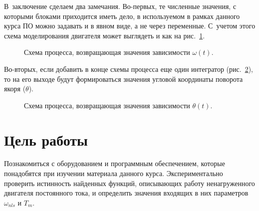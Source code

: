 \documentclass[12pt,a4paper,openany]{extarticle}
\begin{document}
В~заключение сделаем два замечания.
Во-первых, те численные значения, с которыми блоками приходится иметь дело, в используемом в рамках данного курса ПО можно задавать и в явном виде, а не через переменные.
С~учетом этого схема моделирования двигателя может выглядеть и как на рис.~\ref{struct_sheme_chisl}.
\begin{figure}[h]
	\noindent{}
	\caption{Схема процесса, возвращающая значения зависимости $\omega(t)$.}
	\label{struct_sheme_chisl}
\end{figure}
Во-вторых, если добавить в конце схемы процесса еще один интегратор (рис.~\ref{struct_sheme_theta}), то на его выходе будут формироваться значения угловой координаты поворота якоря ($\theta$).
\begin{figure}[h]
	\noindent{}
	\caption{Схема процесса, возвращающая значения зависимости $\theta(t)$.}
	\label{struct_sheme_theta}
\end{figure}

\newpage
\section{Цель работы}
\hspace*{\parindent}Познакомиться с оборудованием и программным обеспечением, которые понадобятся при изучении материала данного курса.
Экспериментально проверить истинность найденных функций, описывающих работу ненагруженного двигателя постоянного тока, и определить значения входящих в них параметров $\omega_{nls}$ и $T_m$.  
\end{document}
